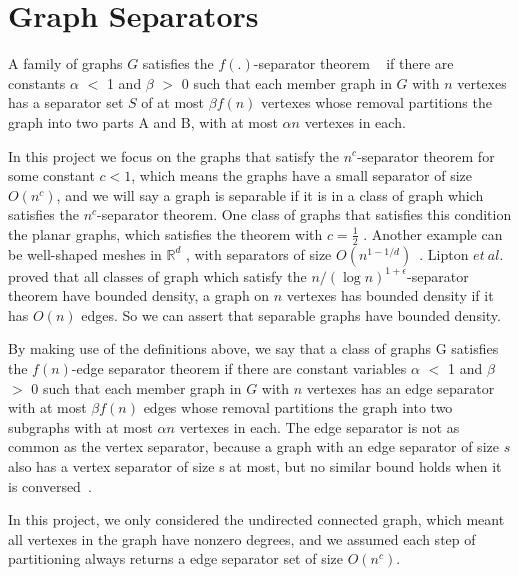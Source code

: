 \documentclass[12pt,glossary]{dalthesis}
\begin{document}
\section{Graph Separators}
A family of graphs $G$ satisfies the $f(.)$-separator theorem ~\cite{separator-theorem} if there are constants $\alpha$ $<$ 1 and $\beta$ $>$ 0 such that each member graph in $G$ with $n$ vertexes has a separator set $S$ of at most $\beta f(n)$ vertexes whose removal partitions the graph into two parts A and B, with at most $\alpha n$ vertexes in each.

\bigskip
\bigskip

In this project we focus on the graphs that satisfy the $n^{c}$-separator theorem for some constant $c < 1$, which means the graphs have a small separator of size $O(n^{c})$, and we will say a graph is separable if it is in a class of graph which satisfies the $n^{c}$-separator theorem. One class of graphs that satisfies this condition the planar graphs, which satisfies the theorem with $c = \frac{1}{2}$ . Another example can be well-shaped meshes in $\mathbb{R}^{d}$ , with separators of size $O(n^{1-1/d})$~\cite{ separators-sphere-packing}.  Lipton $et \ al$.~\cite{Nested-Dissection} proved that all classes of graph which satisfy the $n/(\log n )^{1+\epsilon}$-separator theorem have bounded density, a graph on $n$ vertexes has bounded density if it has $O(n)$ edges. So we can assert that separable graphs have bounded density.

\bigskip
\bigskip

By making use of the definitions above, we say that a class of graphs G satisfies the $f(n)$-edge separator theorem if there are constant variables $\alpha$ $<$ 1 and $\beta$ $>$ 0 such that each member graph in $G$ with $n$ vertexes has an edge separator with at most $\beta f(n)$ edges whose removal partitions the graph into two subgraphs with at most $\alpha n$ vertexes in each. The edge separator is not as common as the vertex separator, because a graph with an edge separator of size $s$ also has a vertex separator of size s at most, but no similar bound holds when it is conversed~\cite{compact-representation}.

\bigskip
\bigskip

In this project, we only considered the undirected connected graph, which meant all vertexes in the graph have nonzero degrees, and we assumed each step of partitioning always returns a edge separator set of size $O(n^{c})$.

\bigskip
\bigskip
\end{document}
